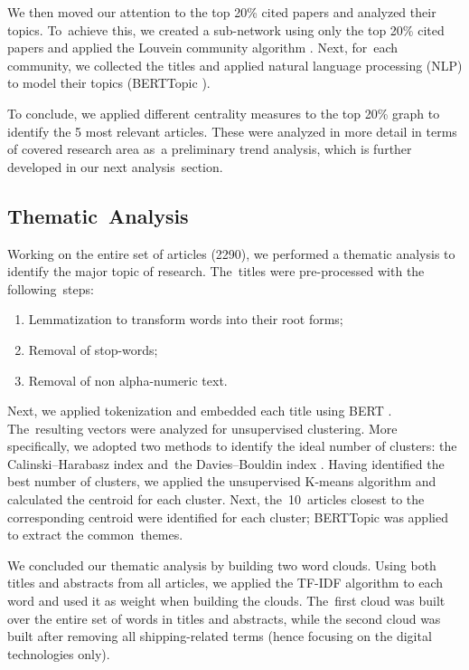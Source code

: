 \documentclass[jmse,review,accept,pdftex,moreauthors]{Definitions/mdpi}
\begin{document}
We then moved our attention to the top 20\% cited papers and analyzed their topics. To~achieve this, we created a sub-network using only the top 20\% cited papers and applied the Louvein community algorithm \citep{blondel2008fast}. {Next, for~each community, {we} collected the titles and applied natural language processing (NLP) to model their topics (BERTTopic \citep{paulcombining}).}%

To conclude, we applied different centrality measures to the top 20\% graph to identify the 5 most relevant articles. These were analyzed  in more detail in terms of covered research area as~a preliminary trend analysis, which is further developed in our {next analysis~section.} %

\subsection{Thematic~Analysis}
Working on the entire set of articles (2290), we performed a thematic analysis to identify the major topic of research. The~titles were pre-processed with the following~steps:
\begin{enumerate}
	\item Lemmatization to transform words into their root forms;
	\item Removal of stop-words;
	\item Removal of non alpha-numeric text.
\end{enumerate}

Next, we applied tokenization and embedded each title using BERT \citep{devlin2018bert}. The~resulting vectors were analyzed for unsupervised clustering. More specifically, we adopted two methods to identify the ideal number of clusters: the Calinski--Harabasz index \citep{calinski1974dendrite} and~the Davies--Bouldin index \citep{davies1979cluster}.
Having identified the best number of clusters, we applied the unsupervised K-means algorithm and calculated the centroid for each cluster.
Next, the~10~articles closest to the corresponding centroid were identified for each cluster; BERTTopic was applied to extract the common~themes.

We concluded our thematic analysis by building two word clouds. Using both titles and abstracts from all articles, we applied the TF-IDF algorithm to each word and used it as weight when building the clouds. The~first cloud was built over the entire set of words in titles and abstracts, while the second cloud was built after removing all shipping-related terms (hence focusing on the digital technologies only).
\end{document}

